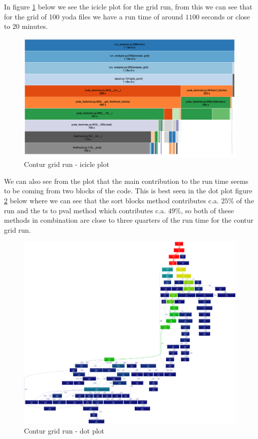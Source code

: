 In figure \ref{fig:grid_yoda_start_profile} below we see the icicle plot for the grid run, from this we can see that for the grid of 100 yoda files we have a run time of around $1100$ seconds or close to $20$ minutes. 
\begin{figure}[H]
\centering
\includegraphics[scale=0.35]{plots/initial_contur_grid_profile_two.png}
\caption{Contur grid run - icicle plot}
\label{fig:grid_yoda_start_profile}
\end{figure}

We can also see from the plot that the main contribution to the run time seems to be coming from two blocks of the code. This is best seen in the dot plot figure \ref{fig:grid_yoda_start_profile_dot} below where we can see that the sort blocks method contributes c.a. $25\%$ of the run and the ts to pval method which contributes c.a. $49\%$, so both of these methods in combination are close to three quarters of the run time for the contur grid run.


\begin{figure}[H]
\centering
\includegraphics[scale=0.1]{plots/initial_contur_grid_two.png}
\caption{Contur grid run - dot plot}
\label{fig:grid_yoda_start_profile_dot}
\end{figure}




